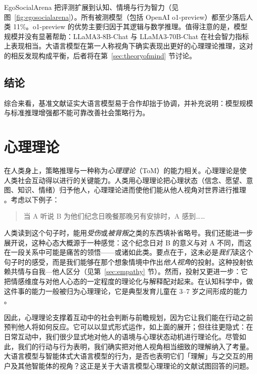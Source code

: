 EgoSocialArena \citep{hou2024entering} 把评测扩展到认知、情境与行为智力（见图~\ref{fig:egosocialarena}）。所有被测模型（包括 OpenAI o1-preview）都至少落后人类 11\%。o1-preview 的优势主要归因于其逻辑与数学推理。值得注意的是，模型规模并没有显著帮助：LLaMA3-8B-Chat 与 LLaMA3-70B-Chat 在社会智力指标上表现相当。大语言模型在第一人称视角下确实表现出更好的心理理论推理，这对 \citet{kim-etal-2023-fantom} 的相反发现构成平衡，后者将在第~\ref{sec:theoryofmind} 节讨论。

\subsection{结论}
综合来看，基准文献证实大语言模型易于合作却拙于协调，并补充说明：模型规模与标准推理增强都不能可靠改善社会策略行为。

\section{心理理论} \label{sec:tom}\label{sec:theoryofmind}
在人类身上，策略推理与一种称为\emph{心理理论}（ToM）的能力相关。心理理论是使人类社会互动得以进行的关键能力。人类用心理理论把心理状态（信念、愿望、意图、知识、情绪）归予他人，心理理论进而使他们能从他人视角对世界进行推理 \citep{premack1978does, apperly2011mindreaders}。考虑以下例子：

\begin{quotation}
     \noindent 当 A 听说 B 为他们纪念日晚餐那晚另有安排时，A 感到……
\end{quotation}

\noindent 人类读到这个句子时，能用{\em 受伤}或{\em 被背叛}之类的东西填补省略号。我们还能进一步展开说，这种心态大概源于一种感觉：这个纪念日对 B 的意义与对 A 不同，而这在一段关系中可能是痛苦的领悟——或诸如此类。要点在于，这未必是\textit{我们}读这个句子时的感受，而是我们能够在那个想象情境中作出\emph{他人视角}的投射。这种投射依赖共情与自我—他人区分（见第~\ref{sec:empathy} 节）。然而，投射又更进一步：它把情感维度与对他人心态的一定程度的理论化与解释配对起来。在认知科学中，做这件事的能力一般被归为心理理论，它是典型发育儿童在 3–7 岁之间形成的能力 \citep{apperly2011mindreaders}。

因此，心理理论支撑着互动中的社会判断与前瞻规划，因为它让我们能在行动之前预判他人将如何反应。它可以以显式形式运作，如上面的展开；但往往更隐式：在日常互动中，我们很少显式地对他人的语境与心理状态动机进行理论化。尽管如此，我们的行动与行为表明，我们确实把对他人视角相当细致的理解纳入了考量。大语言模型与智能体式大语言模型的行为，是否也表明它们「理解」与之交互的用户及其他智能体的视角？这正是关于大语言模型心理理论的文献试图回答的问题。

